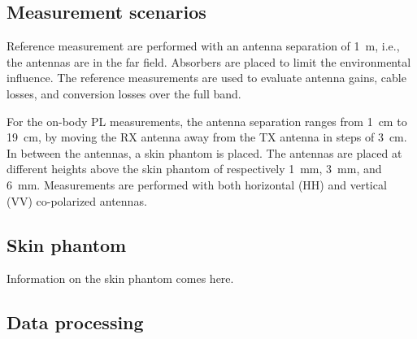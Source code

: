 \documentclass[preprint]{rsl}
\begin{document}
\subsection{Measurement scenarios}

Reference measurement are performed with an antenna separation of 1~m, i.e., the antennas are in the far field. 
Absorbers are placed to limit the environmental influence.
The reference measurements are used to evaluate antenna gains, cable losses, and conversion losses over the full band. 

For the on-body PL measurements, the antenna separation ranges from 1~cm to 19~cm, by moving the RX antenna away from the TX antenna in steps of 3~cm.
In between the antennas, a skin phantom is placed. 
The antennas are placed at different heights above the skin phantom of respectively 1~mm, 3~mm, and 6~mm. 
Measurements are performed with both horizontal (HH) and vertical (VV) co-polarized antennas.

\subsection{Skin phantom}

Information on the skin phantom comes here.

\subsection{Data processing}
\end{document}
